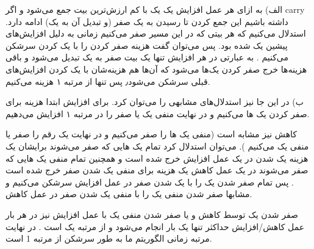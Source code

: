 الف)
به ازای هر عمل افزایش یک یک با کم ارزش‌ترین بیت جمع می‌شود و اگر 
carry 
داشته باشیم این جمع کردن تا رسیدن به یک صفر 
(و تبدیل آن به یک)
ادامه دارد.
استدلال می‌کنیم که هر بیتی که در این مسیر صفر می‌کنیم زمانی به دلیل افزایش‌های پیشین یک شده بود.
پس می‌توان گفت هزینه صفر کردن را با یک کردن سرشکن می‌کنیم
.
به عبارتی در هر افزایش تنها یک بیت صفر به یک تبدیل می‌شود
و باقی هزینه‌ها خرج صفر کردن یک‌ها می‌شود که آن‌ها هم هزینه‌شان با 
یک کردن‌ افزایش‌های قبلی سرشکن می‌شود٫
پس تنها از مرتبه ۱ هزینه می‌کنیم.

ب)
در این جا نیز استدلال‌های مشابهی را می‌توان کرد.
برای افزایش ابتدا هزینه برای صفر کردن یک ها 
می‌کنیم و در نهایت 
منفی یک یا صفر را در مرتبه ۱ افزایش می‌دهیم.

کاهش نیز مشابه است 
(منفی یک ها را صفر می‌کنیم و در نهایت یک رقم را صفر یا منفی یک می‌کنیم
).
می‌توان استدلال کرد تمام یک هایی که صفر می‌شوند برایشان یک هزینه یک شدن در یک عمل افزایش خرج شده است
و همچنین تمام منفی یک هایی که صفر می‌شوند در یک عمل کاهش یک هزینه برای منفی یک شدن صفر خرج شده است
.
پس تمام صفر شدن یک را با یک شدن صفر در عمل افزایش سرشکن می‌کنیم 
و مشابها صفر شدن منفی یک را با منفی یک شدن صفر در عمل کاهش.

صفر شدن یک توسط کاهش و یا صفر شدن منفی یک با عمل افزایش نیز در هر بار عمل کاهش/افزایش حداکثر تنها یک بار انجام می‌شود و از مرتبه یک است
.
در نهایت مرتبه زمانی الگوریتم ما به طور سرشکن از مرتبه 
1 
است.